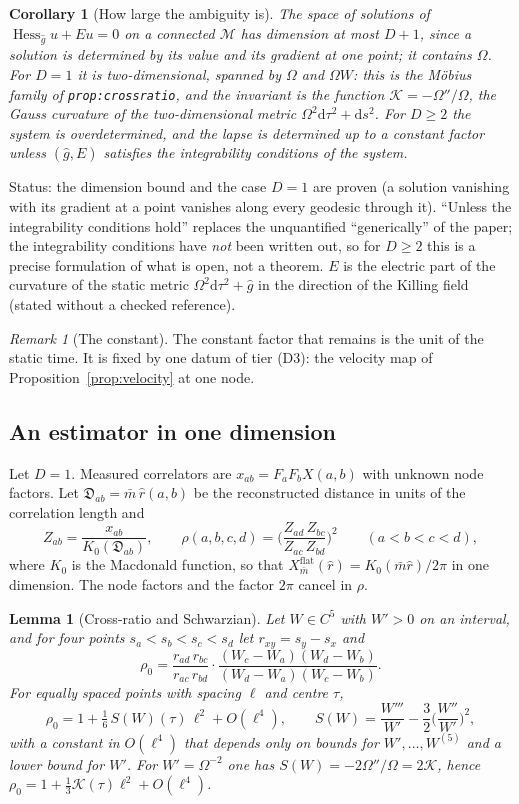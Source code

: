 \documentclass[a4paper,11pt]{article}
\newtheorem{lemma}[theorem]{Lemma}
\newtheorem{corollary}[theorem]{Corollary}
\theoremstyle{definition}
\theoremstyle{remark}
\newtheorem{remark}[theorem]{Remark}
\newcommand{\M}{\mathcal{M}}
\newcommand{\dd}{\mathrm{d}}
\newcommand{\status}[1]{\par\noindent\textsf{\small Status: #1}\par}
\begin{document}
\begin{corollary}[How large the ambiguity is]\label{cor:ambiguity}
The space of solutions of $\operatorname{Hess}_{\hat g}u+Eu=0$ on a connected $\M$ has dimension at most $D+1$, since a solution is determined by its value and its gradient at one point; it contains $\Omega$. For $D=1$ it is two-dimensional, spanned by $\Omega$ and $\Omega W$: this is the M\"obius family of \texttt{prop:crossratio}, and the invariant is the function $\mathcal K=-\Omega''/\Omega$, the Gauss curvature of the two-dimensional metric $\Omega^2\dd\tau^2+\dd s^2$. For $D\ge2$ the system is overdetermined, and the lapse is determined up to a constant factor unless $(\hat g,E)$ satisfies the integrability conditions of the system.
\end{corollary}
\status{the dimension bound and the case $D=1$ are proven (a solution vanishing with its gradient at a point vanishes along every geodesic through it). ``Unless the integrability conditions hold'' replaces the unquantified ``generically'' of the paper; the integrability conditions have \emph{not} been written out, so for $D\ge2$ this is a precise formulation of what is open, not a theorem. $E$ is the electric part of the curvature of the static metric $\Omega^2\dd\tau^2+\hat g$ in the direction of the Killing field (stated without a checked reference).}

\begin{remark}[The constant]
The constant factor that remains is the unit of the static time. It is fixed by one datum of tier \textup{(D3)}: the velocity map of Proposition~\ref{prop:velocity} at one node.
\end{remark}

\subsection{An estimator in one dimension}

Let $D=1$. Measured correlators are $x_{ab}=F_aF_bX(a,b)$ with unknown node factors. Let $\mathfrak D_{ab}=\bar m\,\hat r(a,b)$ be the reconstructed distance in units of the correlation length and
\[
Z_{ab}=\frac{x_{ab}}{K_0(\mathfrak D_{ab})},\qquad
\rho(a,b,c,d)=\Big(\frac{Z_{ad}\,Z_{bc}}{Z_{ac}\,Z_{bd}}\Big)^2\qquad(a<b<c<d),
\]
where $K_0$ is the Macdonald function, so that $X^{\mathrm{flat}}_{\bar m}(\hat r)=K_0(\bar m\hat r)/2\pi$ in one dimension. The node factors and the factor $2\pi$ cancel in $\rho$.

\begin{lemma}[Cross-ratio and Schwarzian]\label{lem:schwarz}
Let $W\in C^5$ with $W'>0$ on an interval, and for four points $s_a<s_b<s_c<s_d$ let $r_{xy}=s_y-s_x$ and
\[
\rho_0=\frac{r_{ad}\,r_{bc}}{r_{ac}\,r_{bd}}\cdot\frac{(W_c-W_a)(W_d-W_b)}{(W_d-W_a)(W_c-W_b)} .
\]
For equally spaced points with spacing $\ell$ and centre $\tau$,
\[
\rho_0=1+\tfrac16\,S(W)(\tau)\,\ell^2+O(\ell^4),\qquad S(W)=\frac{W'''}{W'}-\frac32\Big(\frac{W''}{W'}\Big)^2 ,
\]
with a constant in $O(\ell^4)$ that depends only on bounds for $W',\dots,W^{(5)}$ and a lower bound for $W'$. For $W'=\Omega^{-2}$ one has $S(W)=-2\Omega''/\Omega=2\mathcal K$, hence $\rho_0=1+\tfrac13\mathcal K(\tau)\ell^2+O(\ell^4)$.
\end{lemma}
\end{document}
